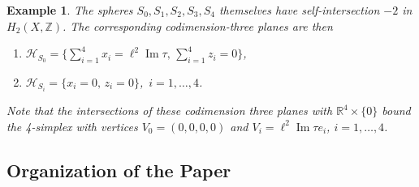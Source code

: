 \documentclass[12pt,letterpaper,reqno]{amsart}
\newtheorem{ex}[thm]{Example}
\theoremstyle{remark}
\theoremstyle{definition}
\numberwithin{thm}{section}
\numberwithin{equation}{section}
\numberwithin{figure}{section}
\newcommand{\R}{\ensuremath{\mathbb R}}
\newcommand{\Z}{\ensuremath{\mathbb Z}}
\DeclareMathOperator{\im}{Im}
\begin{document}
\begin{ex}
The spheres $S_0, S_1, S_2, S_3, S_4$ themselves have self-intersection $-2$ in $H_2(X,\Z)$. The corresponding codimension-three planes are then
\begin{enumerate}
\item $\mathcal{H}_{S_0}= \{ \sum_{i=1}^4 x_i = \ell^2 \im \tau, \, \sum_{i=1}^4 z_i =0 \}$,
\smallskip
\item $\mathcal{H}_{S_i} = \{ x_{i} = 0, \, z_i = 0 \}$,\ $i = 1, \ldots, 4$.
\end{enumerate}
Note that the intersections of these codimension three planes with $\R^4 \times \{0\}$ bound 
the 4-simplex with vertices $V_0=(0,0,0,0)$ and $V_i = \ell^2 \im \tau e_i$, $i = 1, \ldots, 4$.
\end{ex}




\subsection{Organization of the Paper}
\end{document}
